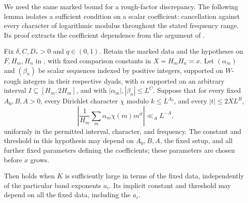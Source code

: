 We need the same marked bound for a rough-factor discrepancy.  The
following lemma isolates a sufficient condition on a scalar
coefficient: cancellation against every character of logarithmic
modulus throughout the stated frequency range.  Its proof extracts
the coefficient dependence from the argument of
\cite[Theorem~3.1]{PoissonDirichlet}.

\begin{lemma}
\label{lem:marked-coefficient-transfer}
Fix \(\delta,C,D_*>0\) and \(q\in(0,1)\).  Retain the marked data and
the hypotheses on \(F,H_m,H_n\) in , with fixed
comparison constants in \(X=H_mH_n\asymp x\).  Let
\((\alpha_m)\) and \((\beta_n)\) be scalar sequences indexed by positive
integers, supported on \(W\)-rough integers in their respective dyads,
with \(\alpha\) supported on an arbitrary interval
\(I\subseteq[H_m,2H_m]\), and with
\(|\alpha_m|,|\beta_n|\le L^C\).  Suppose that for every fixed
\(A_0,B,A>0\), every Dirichlet character \(\chi\) modulo
\(k\le L^{A_0}\), and every \(|t|\le2XL^B\),
\begin{equation}\label{eq:type-ii-long-coefficient-interface}
 \left|\frac1{H_m}\sum_m\alpha_m\chi(m)m^{it}\right|\ll_A L^{-A},
\end{equation}
uniformly in the permitted interval, character, and frequency.  The
constant and threshold in this hypothesis may depend on \(A_0,B,A\),
the fixed setup, and all further fixed parameters defining the
coefficients; these parameters are chosen before \(x\) grows.

Then  holds when \(K\) is sufficiently large
in terms of the fixed data, independently of the particular band
exponents \(a_i\).  Its implicit constant and threshold may depend on
all the fixed data, including the \(a_i\).
\end{lemma}

